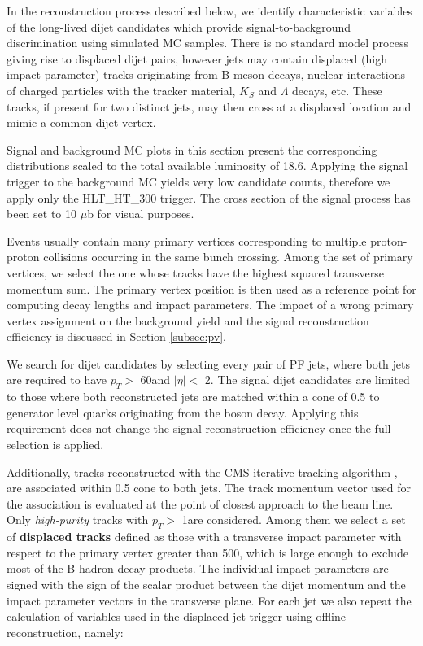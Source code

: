 In the reconstruction process described below, we identify characteristic variables
of the long-lived dijet candidates which provide
signal-to-background discrimination using simulated MC samples.    
There is no standard model process giving rise to displaced dijet pairs,
however jets may contain displaced (high impact parameter) tracks originating from B meson decays, nuclear
interactions of charged particles with the tracker material, $K_S$ and $\Lambda$ decays, etc. These tracks, if 
present for two distinct jets,
may then cross at a displaced location and mimic a common dijet vertex. 

Signal and background MC plots in this section present the corresponding distributions 
scaled to the total available luminosity
of 18.6\fbinv. Applying the signal trigger to the background MC yields very low candidate counts, therefore
we apply only the HLT\_HT\_300 trigger.  
 The cross section of the signal process has been set to 10 $\mu$b for visual purposes.   

Events usually contain many primary vertices corresponding to multiple proton-proton collisions occurring 
in the same bunch crossing.
Among the set of primary vertices, we select the one whose tracks have the highest squared transverse momentum sum.
 The primary vertex position is
then used as a reference point for computing decay lengths and impact parameters. The impact of a wrong
primary vertex assignment on the background yield and the signal reconstruction efficiency is discussed
in Section \ref{subsec:pv}. 


We search for dijet candidates by selecting every pair of PF jets, where both jets are required to 
have $p_T>$ 60\GeVc and $|\eta|<$ 2. 
The signal dijet candidates are limited
to those where both reconstructed jets are matched within a cone of 0.5 to generator level quarks originating
 from the \X boson decay. Applying this requirement does not change the signal reconstruction efficiency
once the full selection is applied. 

 
Additionally, tracks reconstructed with 
the CMS iterative tracking
algorithm \cite{CMS_IN_2007-065}, are associated within 0.5 cone to both jets. The track momentum vector used for 
the association is evaluated at the point of closest approach to the beam line. Only {\it high-purity} tracks
with $p_T>$ 1\GeVc are considered. Among them we select a set of {\bf displaced tracks} defined as those with
a transverse impact parameter with respect to the primary vertex greater than 500\micron, which is large enough
to exclude most of the B hadron decay products. 
The individual impact parameters are signed with the sign of the scalar product between
 the dijet momentum and the impact parameter vectors in the transverse plane.
For each jet we also repeat the calculation of variables used in the displaced jet trigger
 using offline reconstruction, namely:

